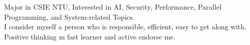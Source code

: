 

\begin{cvparagraph}

Major in CSIE  NTU,  Interested  in  AI,  Security,  Performance,  Parallel  Programming, and  System-related Topics.
\\ I consider myself a person who is responsible, efficient, easy to get along with. Positive thinking m fast learner and active endorse me.
\end{cvparagraph}
